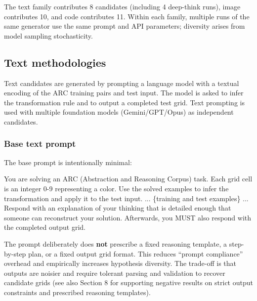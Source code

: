 \documentclass[11pt]{article}
\newenvironment{Shaded}{}{}
\newcommand{\NormalTok}[1]{#1}
\begin{document}
The text family contributes 8 candidates (including 4 deep-think runs),
image contributes 10, and code contributes 11. Within each family,
multiple runs of the same generator use the same prompt and API
parameters; diversity arises from model sampling stochasticity.

\hypertarget{text-methodologies}{%
\subsection{Text methodologies}\label{text-methodologies}}

Text candidates are generated by prompting a language model with a
textual encoding of the ARC training pairs and test input. The model is
asked to infer the transformation rule and to output a completed test
grid. Text prompting is used with multiple foundation models
(Gemini/GPT/Opus) as independent candidates.

\hypertarget{base-text-prompt}{%
\subsubsection{Base text prompt}\label{base-text-prompt}}

The base prompt is intentionally minimal:

\begin{Shaded}
\begin{Highlighting}[]
\NormalTok{You are solving an ARC (Abstraction and Reasoning Corpus)}
\NormalTok{task. Each grid cell is an integer 0{-}9 representing a color.}
\NormalTok{Use the solved examples to infer the transformation and}
\NormalTok{apply it to the test input.}
\NormalTok{...}
\NormalTok{\{training and test examples\}}
\NormalTok{...}
\NormalTok{Respond with an explanation of your thinking that is detailed}
\NormalTok{enough that someone can reconstruct your solution. Afterwards,}
\NormalTok{you MUST also respond with the completed output grid.}
\end{Highlighting}
\end{Shaded}

The prompt deliberately does \textbf{not} prescribe a fixed reasoning
template, a step-by-step plan, or a fixed output grid format. This
reduces ``prompt compliance'' overhead and empirically increases
hypothesis diversity. The trade-off is that outputs are noisier and
require tolerant parsing and validation to recover candidate grids (see
also Section 8 for supporting negative results on strict output
constraints and prescribed reasoning templates).
\end{document}
